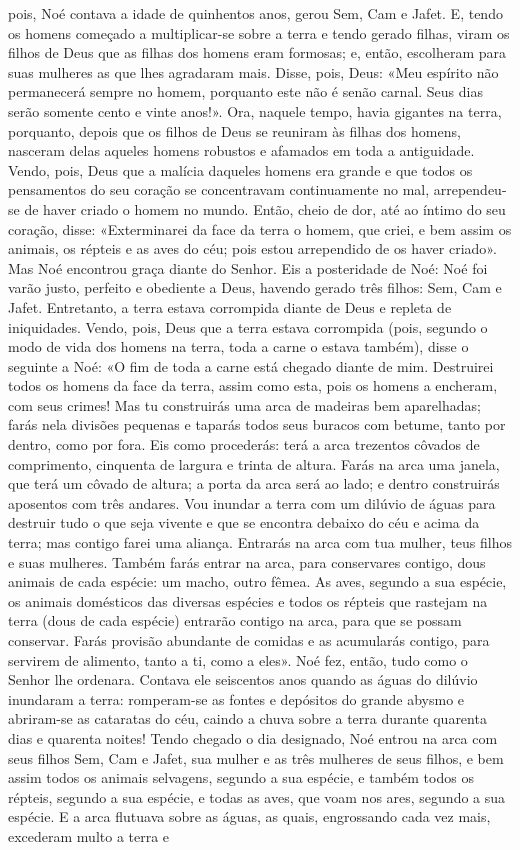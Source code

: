 \begin{paracol}{2}
{ pois, Noé contava a idade de quinhentos anos, gerou Sem, Cam e Jafet. E, tendo os homens começado a multiplicar-se sobre a terra e tendo gerado filhas, viram os filhos de Deus que as filhas dos homens eram formosas; e, então, escolheram para suas mulheres as que lhes agradaram mais. Disse, pois, Deus: «Meu espírito não permanecerá sempre no homem, porquanto este não é senão carnal. Seus dias serão somente cento e vinte anos!». Ora, naquele tempo, havia gigantes na terra, porquanto, depois que os filhos de Deus se reuniram às filhas dos homens, nasceram delas aqueles homens robustos e afamados em toda a antiguidade. Vendo, pois, Deus que a malícia daqueles homens era grande e que todos os pensamentos do seu coração se concentravam continuamente no mal, arrependeu-se de haver criado o homem no mundo. Então, cheio de dor, até ao íntimo do seu coração, disse: «Exterminarei da face da terra o homem, que criei, e bem assim os animais, os répteis e as aves do céu; pois estou arrependido de os haver criado». Mas Noé encontrou graça diante do Senhor. Eis a posteridade de Noé: Noé foi varão justo, perfeito e obediente a Deus, havendo gerado três filhos: Sem, Cam e Jafet. Entretanto, a terra estava corrompida diante de Deus e repleta de iniquidades. Vendo, pois, Deus que a terra estava corrompida (pois, segundo o modo de vida dos homens na terra, toda a carne o estava também), disse o seguinte a Noé: «O fim de toda a carne está chegado diante de mim. Destruirei todos os homens da face da terra, assim como esta, pois os homens a encheram, com seus crimes! Mas tu construirás uma arca de madeiras bem aparelhadas; farás nela divisões pequenas e taparás todos seus buracos com betume, tanto por dentro, como por fora. Eis como procederás: terá a arca trezentos côvados de comprimento, cinquenta de largura e trinta de altura. Farás na arca uma janela, que terá um côvado de altura; a porta da arca será ao lado; e dentro construirás aposentos com três andares. Vou inundar a terra com um dilúvio de águas para destruir tudo o que seja vivente e que se encontra debaixo do céu e acima da terra; mas contigo farei uma aliança. Entrarás na arca com tua mulher, teus filhos e suas mulheres. Também farás entrar na arca, para conservares contigo, dous animais de cada espécie: um macho, outro fêmea. As aves, segundo a sua espécie, os animais domésticos das diversas espécies e todos os répteis que rastejam na terra (dous de cada espécie) entrarão contigo na arca, para que se possam conservar. Farás provisão abundante de comidas e as acumularás contigo, para servirem de alimento, tanto a ti, como a eles». Noé fez, então, tudo como o Senhor lhe ordenara. Contava ele seiscentos anos quando as águas do dilúvio inundaram a terra: romperam-se as fontes e depósitos do grande abysmo e abriram-se as cataratas do céu, caindo a chuva sobre a terra durante quarenta dias e quarenta noites! Tendo chegado o dia designado, Noé entrou na arca com seus filhos Sem, Cam e Jafet, sua mulher e as três mulheres de seus filhos, e bem assim todos os animais selvagens, segundo a sua espécie, e também todos os répteis, segundo a sua espécie, e todas as aves, que voam nos ares, segundo a sua espécie. E a arca flutuava sobre as águas, as quais, engrossando cada vez mais, excederam multo a terra e }
\end{paracol}
